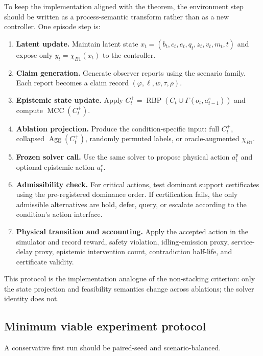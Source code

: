 \documentclass[11pt]{article}
\newcommand{\RBP}{\operatorname{RBP}}
\newcommand{\MCC}{\operatorname{MCC}}
\newcommand{\Agg}{\operatorname{Agg}}
\newcommand{\1}{\mathbf{1}}
\theoremstyle{definition}
\theoremstyle{plain}
\theoremstyle{remark}
\begin{document}
To keep the implementation aligned with the theorem, the environment step should be written as a process-semantic transform rather than as a new controller. One episode step is:

\begin{enumerate}[leftmargin=1.7em,label=\textbf{E\arabic*:}]
\item \textbf{Latent update.} Maintain latent state $x_t=(b_t,c_t,e_t,q_t,z_t,v_t,m_t,t)$ and expose only $y_t=\chi_{B1}(x_t)$ to the controller.
\item \textbf{Claim generation.} Generate observer reports using the scenario family. Each report becomes a claim record $(\varphi,\ell,w,\tau,\rho)$.
\item \textbf{Epistemic state update.} Apply $C_t^+=\RBP(C_t\cup \Gamma(o_t,a_{t-1}^e))$ and compute $\MCC(C_t^+)$.
\item \textbf{Ablation projection.} Produce the condition-specific input: full $C_t^+$, collapsed $\Agg(C_t^+)$, randomly permuted labels, or oracle-augmented $\chi_{B1}$.
\item \textbf{Frozen solver call.} Use the same solver to propose physical action $a_t^p$ and optional epistemic action $a_t^e$.
\item \textbf{Admissibility check.} For critical actions, test dominant support certificates using the pre-registered dominance order. If certification fails, the only admissible alternatives are hold, defer, query, or escalate according to the condition's action interface.
\item \textbf{Physical transition and accounting.} Apply the accepted action in the simulator and record reward, safety violation, idling-emission proxy, service-delay proxy, epistemic intervention count, contradiction half-life, and certificate validity.
\end{enumerate}

This protocol is the implementation analogue of the non-stacking criterion: only the state projection and feasibility semantics change across ablations; the solver identity does not.

\subsection{Minimum viable experiment protocol}
\label{supp:subsec:b1-experiment-protocol}

A conservative first run should be paired-seed and scenario-balanced.
\end{document}
